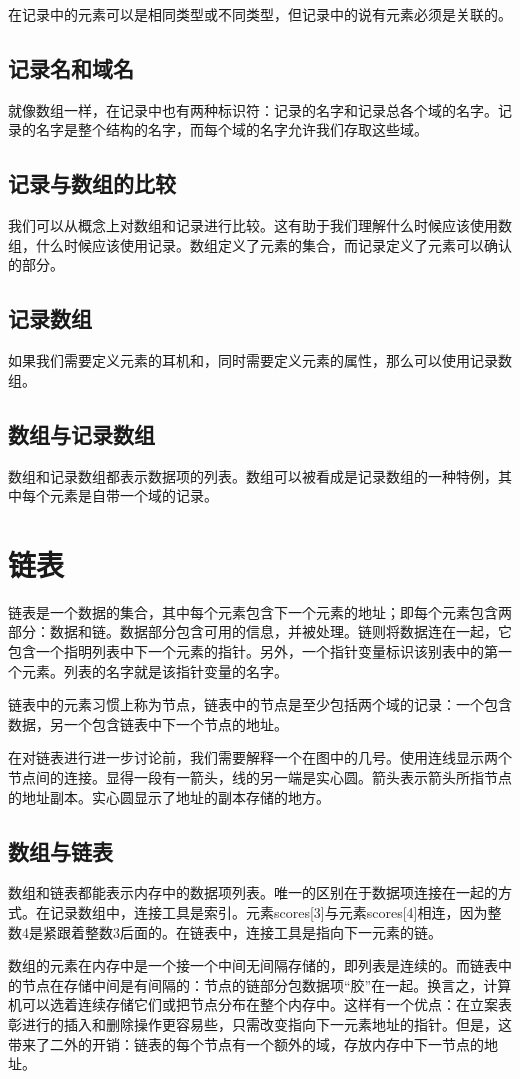 在记录中的元素可以是相同类型或不同类型，但记录中的说有元素必须是关联的。
\subsection{记录名和域名}
就像数组一样，在记录中也有两种标识符：记录的名字和记录总各个域的名字。记录的名字是整个结构的名字，而每个域的名字允许我们存取这些域。
\subsection{记录与数组的比较}
我们可以从概念上对数组和记录进行比较。这有助于我们理解什么时候应该使用数组，什么时候应该使用记录。数组定义了元素的集合，而记录定义了元素可以确认的部分。
\subsection{记录数组}
如果我们需要定义元素的耳机和，同时需要定义元素的属性，那么可以使用记录数组。
\subsection{数组与记录数组}
数组和记录数组都表示数据项的列表。数组可以被看成是记录数组的一种特例，其中每个元素是自带一个域的记录。
\section{链表}
链表是一个数据的集合，其中每个元素包含下一个元素的地址；即每个元素包含两部分：数据和链。数据部分包含可用的信息，并被处理。链则将数据连在一起，它包含一个指明列表中下一个元素的指针。另外，一个指针变量标识该别表中的第一个元素。列表的名字就是该指针变量的名字。

链表中的元素习惯上称为节点，链表中的节点是至少包括两个域的记录：一个包含数据，另一个包含链表中下一个节点的地址。

在对链表进行进一步讨论前，我们需要解释一个在图中的几号。使用连线显示两个节点间的连接。显得一段有一箭头，线的另一端是实心圆。箭头表示箭头所指节点的地址副本。实心圆显示了地址的副本存储的地方。
\subsection{数组与链表}
数组和链表都能表示内存中的数据项列表。唯一的区别在于数据项连接在一起的方式。在记录数组中，连接工具是索引。元素scores[3]与元素scores[4]相连，因为整数4是紧跟着整数3后面的。在链表中，连接工具是指向下一元素的链。

数组的元素在内存中是一个接一个中间无间隔存储的，即列表是连续的。而链表中的节点在存储中间是有间隔的：节点的链部分包数据项“胶”在一起。换言之，计算机可以选着连续存储它们或把节点分布在整个内存中。这样有一个优点：在立案表彰进行的插入和删除操作更容易些，只需改变指向下一元素地址的指针。但是，这带来了二外的开销：链表的每个节点有一个额外的域，存放内存中下一节点的地址。
